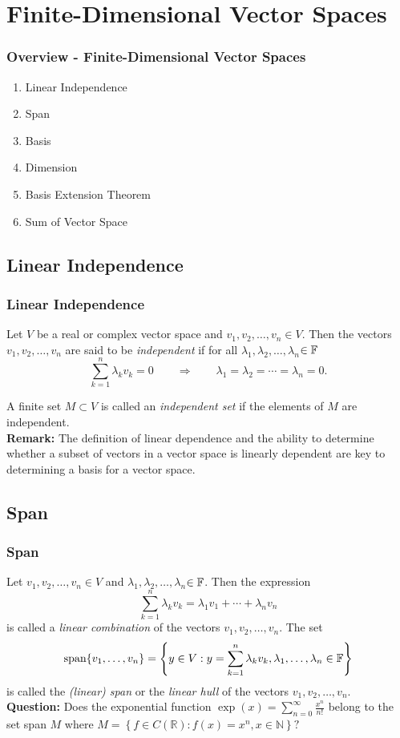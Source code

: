 \documentclass[12pt, t]{beamer}
\renewcommand{\emph}[1]{{\color{Turquoise3}\textsl{#1}}}
\newcommand{\myseries}[2]{$#1_1,#1_2,\dots,#1_#2$}
\newcommand{\nullspace}{~\\[15pt]}
\newcommand{\remark}{\textbf{Remark: }}
\begin{document}
\section{Finite-Dimensional Vector Spaces}

\begin{frame}
    \frametitle{Overview - Finite-Dimensional Vector Spaces}
    \begin{enumerate}
        \item Linear Independence
        \item Span
        \item Basis
        \item Dimension
        \item Basis Extension Theorem
        \item Sum of Vector Space
    \end{enumerate}
\end{frame}

\subsection{Linear Independence}
\begin{frame}
    \frametitle{Linear Independence}
    Let $V$ be a real or complex vector space and \myseries{v}{n}$\in V$. Then the vectors \myseries{v}{n} are said to be \emph{independent} if for all \myseries{\lambda}{n}$\in\mathbb{F}$ \vspace*{-4mm}
    \[\sum_{k=1}^{n}\lambda_kv_k=0\qquad\Rightarrow\qquad\lambda_1=\lambda_2=\cdots=\lambda_n=0.\]

    A finite set $M\subset V$ is called an \emph{independent set} if the elements of $M$ are independent.
    \nullspace
    \remark The definition of linear dependence and the ability to determine whether a subset of vectors in a vector space is linearly dependent are key to determining a basis for a vector space.
\end{frame}

\subsection{Span}
\begin{frame}
    \frametitle{Span}
    Let \myseries{v}{n}$\in V$ and \myseries{\lambda}{n}$\in\mathbb{F}$. Then the expression
    \begin{equation*}
        \sum_{k=1}^{n}\lambda_kv_k=\lambda_1v_1+\cdots+\lambda_nv_n
    \end{equation*}
    is called a \emph{linear combination} of the vectors \myseries{v}{n}. The set
    \[\text{span}\{v_1,\ldots,v_n\}=\left\{y\in V:y=\sum_{k=1}^{n}\lambda_kv_k,\lambda_1,\ldots,\lambda_n\in\mathbb{F}\right\}\]
    is called the \emph{(linear) span} or the \emph{linear hull} of the vectors \myseries{v}{n}.\nullspace
    \textbf{Question: } Does the exponential function $\exp (x)=\sum_{n=0}^{\infty} \frac{x^{n}}{n !}$ belong to the set span $M$ where $M=\left\{f \in C(\mathbb{R}): f(x)=x^{n}, x \in \mathbb{N}\right\} ?$

\end{frame}
\end{document}
